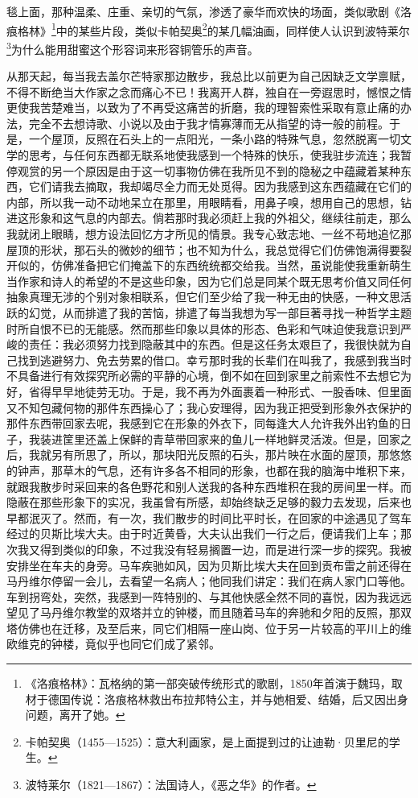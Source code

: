 毯上面，那种温柔、庄重、亲切的气氛，渗透了豪华而欢快的场面，类似歌剧《洛痕格林》\footnote{《洛痕格林》：瓦格纳的第一部突破传统形式的歌剧，1850年首演于魏玛，取材于德国传说：洛痕格林救出布拉邦特公主，并与她相爱、结婚，后又因出身问题，离开了她。}中的某些片段，类似卡帕契奥\footnote{卡帕契奥（1455—1525）：意大利画家，是上面提到过的让迪勒·贝里尼的学生。}的某几幅油画，同样使人认识到波特莱尔\footnote{波特莱尔（1821—1867）：法国诗人，《恶之华》的作者。}为什么能用甜蜜这个形容词来形容铜管乐的声音。
\par 从那天起，每当我去盖尔芒特家那边散步，我总比以前更为自己因缺乏文学禀赋，不得不断绝当大作家之念而痛心不已！我离开人群，独自在一旁遐思时，憾恨之情更使我苦楚难当，以致为了不再受这痛苦的折磨，我的理智索性采取有意止痛的办法，完全不去想诗歌、小说以及由于我才情寡薄而无从指望的诗一般的前程。于是，一个屋顶，反照在石头上的一点阳光，一条小路的特殊气息，忽然脱离一切文学的思考，与任何东西都无联系地使我感到一个特殊的快乐，使我驻步流连；我暂停观赏的另一个原因是由于这一切事物仿佛在我所见不到的隐秘之中蕴藏着某种东西，它们请我去摘取，我却竭尽全力而无处觅得。因为我感到这东西蕴藏在它们的内部，所以我一动不动地呆立在那里，用眼睛看，用鼻子嗅，想用自己的思想，钻进这形象和这气息的内部去。倘若那时我必须赶上我的外祖父，继续往前走，那么我就闭上眼睛，想方设法回忆方才所见的情景。我专心致志地、一丝不苟地追忆那屋顶的形状，那石头的微妙的细节；也不知为什么，我总觉得它们仿佛饱满得要裂开似的，仿佛准备把它们掩盖下的东西统统都交给我。当然，虽说能使我重新萌生当作家和诗人的希望的不是这些印象，因为它们总是同某个既无思考价值又同任何抽象真理无涉的个别对象相联系，但它们至少给了我一种无由的快感，一种文思活跃的幻觉，从而排遣了我的苦恼，排遣了每当我想为写一部巨著寻找一种哲学主题时所自恨不已的无能感。然而那些印象以具体的形态、色彩和气味迫使我意识到严峻的责任：我必须努力找到隐蔽其中的东西。但是这任务太艰巨了，我很快就为自己找到逃避努力、免去劳累的借口。幸亏那时我的长辈们在叫我了，我感到我当时不具备进行有效探究所必需的平静的心境，倒不如在回到家里之前索性不去想它为好，省得早早地徒劳无功。于是，我不再为外面裹着一种形式、一股香味、但里面又不知包藏何物的那件东西操心了；我心安理得，因为我正把受到形象外衣保护的那件东西带回家去呢，我感到它在形象的外衣下，同每逢大人允许我外出钓鱼的日子，我装进筐里还盖上保鲜的青草带回家来的鱼儿一样地鲜灵活泼。但是，回家之后，我就另有所思了，所以，那块阳光反照的石头，那片映在水面的屋顶，那悠悠的钟声，那草木的气息，还有许多各不相同的形象，也都在我的脑海中堆积下来，就跟我散步时采回来的各色野花和别人送我的各种东西堆积在我的房间里一样。而隐蔽在那些形象下的实况，我虽曾有所感，却始终缺乏足够的毅力去发现，后来也早都泯灭了。然而，有一次，我们散步的时间比平时长，在回家的中途遇见了驾车经过的贝斯比埃大夫。由于时近黄昏，大夫认出我们一行之后，便请我们上车；那次我又得到类似的印象，不过我没有轻易搁置一边，而是进行深一步的探究。我被安排坐在车夫的身旁。马车疾驰如风，因为贝斯比埃大夫在回到贡布雷之前还得在马丹维尔停留一会儿，去看望一名病人；他同我们讲定：我们在病人家门口等他。车到拐弯处，突然，我感到一阵特别的、与其他快感全然不同的喜悦，因为我远远望见了马丹维尔教堂的双塔并立的钟楼，而且随着马车的奔驰和夕阳的反照，那双塔仿佛也在迁移，及至后来，同它们相隔一座山岗、位于另一片较高的平川上的维欧维克的钟楼，竟似乎也同它们成了紧邻。
